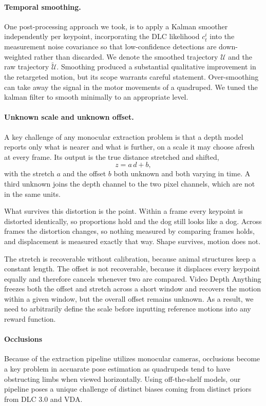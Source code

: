 \documentclass{article}
\theoremstyle{plain}
\theoremstyle{definition}
\theoremstyle{remark}
\begin{document}
\paragraph{Temporal smoothing.} One post-processing approach we took, is to apply a Kalman smoother
independently per keypoint, incorporating the DLC likelihood $c_t^i$ into the measurement noise covariance so that low-confidence detections are down-weighted rather than discarded. We denote the smoothed trajectory $\mathcal{U}$ and the raw trajectory $\tilde{\mathcal{U}}$. Smoothing produced a substantial qualitative improvement in the retargeted motion, but its scope
warrants careful statement. Over-smoothing can take away the signal in the motor movements of a quadruped. We tuned the kalman filter to smooth minimally to an appropriate level.

\paragraph{Unknown scale and unknown offset.} A key challenge of any monocular extraction problem is that a depth model reports only what is nearer and what is further, on a scale it may choose afresh at every frame. Its output is the true distance stretched and shifted,
\begin{equation}
    z = a\,d + b,
    \label{eq:gauge}
\end{equation}
with the stretch $a$ and the offset $b$ both unknown and both varying in time.
A third unknown joins the depth channel to the two pixel channels, which are
not in the same units.

What survives this distortion is the point. Within a frame every keypoint is
distorted identically, so proportions hold and the dog still looks like a dog.
Across frames the distortion changes, so nothing measured by comparing frames
holds, and displacement is measured exactly that way. Shape survives, motion
does not.

The stretch is recoverable without calibration, because animal structures keep a constant length. The offset is not recoverable, because it displaces every keypoint equally and therefore cancels whenever two are compared. Video Depth Anything freezes both the offset and stretch across a short window and recovers the motion within a given window, but the overall offset remains unknown. As a result, we need to arbitrarily define the scale before inputting reference motions into any reward function.

\paragraph{Occlusions}
Because of  the extraction pipeline utilizes monocular cameras, occlusions become a key problem in accuarate pose estimation as quadrupeds tend to have obstructing limbs when viewed horizontally. Using off-the-shelf models, our pipeline poses a unique challenge of distinct biases coming from distinct priors from DLC 3.0 and VDA. 
\end{document}
